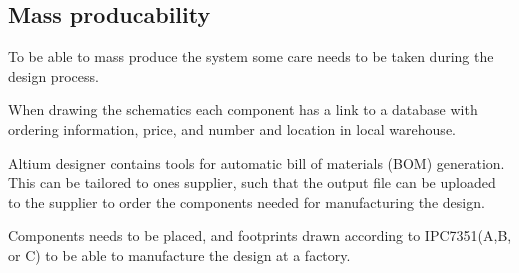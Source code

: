 \subsection{Mass producability}
To be able to mass produce the system some care needs to be taken during the design process.

When drawing the schematics each component has a link to a database with ordering information, price, and number and location in local warehouse.

Altium designer contains tools for automatic bill of materials (BOM) generation. This can be tailored to ones supplier, such that the output file can be uploaded to the supplier to order the components needed for manufacturing the design.



Components needs to be placed, and footprints drawn according to IPC7351(A,B, or C) to be able to manufacture the design at a factory.


